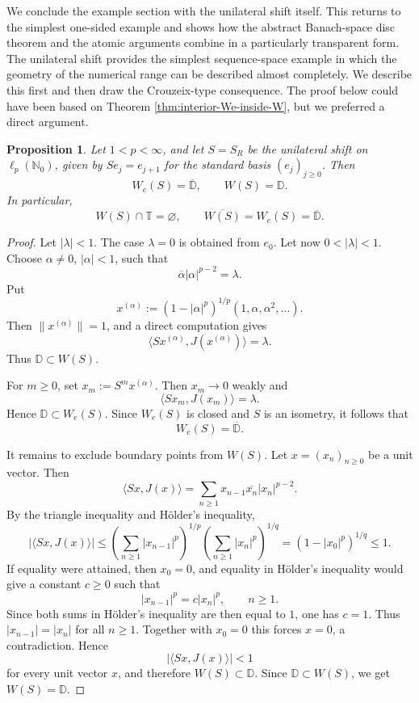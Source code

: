 \documentclass[11pt]{amsart}
\numberwithin{equation}{section}
\newtheorem{proposition}[theorem]{Proposition}
\theoremstyle{definition}
\theoremstyle{remark}
\newcommand{\N}{\mathbb{N}}
\newcommand{\T}{\mathbb{T}}
\newcommand{\D}{\mathbb{D}}
\newcommand{\We}{W_e}
\begin{document}
We conclude the example section with the unilateral shift itself. This returns to the simplest one-sided example and shows how the abstract Banach-space disc theorem and the atomic arguments combine in a particularly transparent form.
The unilateral shift provides the simplest sequence-space example in which the geometry of the numerical range can be described almost completely. We describe this first and then draw the Crouzeix-type consequence.
The proof below could have been based on
Theorem \ref{thm:interior-We-inside-W},
but we preferred a direct argument.
\begin{proposition}\label{cor:shift-disk-lp}
Let \(1<p<\infty\), and let \(S=S_R\) be the unilateral shift on
\(\ell_p(\N_0)\), given by \(Se_j=e_{j+1}\) for the standard basis
\((e_j)_{j\ge0}\). Then
\[
        \We(S)=\overline{\D},\qquad W(S)=\D.
\]
In particular,
\[
        W(S)\cap\T=\varnothing,
        \qquad
        \overline{W(S)}=\We(S)=\overline{\D}.
\]
\end{proposition}
\begin{proof}
Let \(|\lambda|<1\). 
The case \(\lambda=0\) is obtained from \(e_0\). Let now \(0<|\lambda|<1\).
Choose \(\alpha\ne0\), \(|\alpha|<1\), such that
\[
        \overline{\alpha}|\alpha|^{p-2}=\lambda .
\]
Put
\[
        x^{(\alpha)}
        :=
        (1-|\alpha|^p)^{1/p}(1,\alpha,\alpha^2,\ldots).
\]
Then \(\|x^{(\alpha)}\|=1\), and a direct computation gives
\[
        \langle Sx^{(\alpha)},J(x^{(\alpha)})\rangle=\lambda.
\]
Thus \(\mathbb D\subset W(S)\).

For \(m\ge0\), set \(x_m:=S^m x^{(\alpha)}\). Then \(x_m\to0\) weakly and
\[
        \langle Sx_m,J(x_m)\rangle=\lambda.
\]
Hence \(\mathbb D\subset W_e(S)\). Since \(W_e(S)\) is closed and \(S\) is an
isometry, it follows that
\[
        W_e(S)=\overline{\mathbb D}.
\]



It remains to exclude boundary points from \(W(S)\). Let \(x=(x_n)_{n\ge0}\)
be a unit vector. Then
\[
        \langle Sx,J(x)\rangle
        =
        \sum_{n\ge1}x_{n-1}\overline{x_n}|x_n|^{p-2}.
\]
By the triangle inequality and Hölder's inequality,
\[
        |\langle Sx,J(x)\rangle|
        \le
        \left(\sum_{n\ge1}|x_{n-1}|^p\right)^{1/p}
        \left(\sum_{n\ge1}|x_n|^p\right)^{1/q}
        =
        (1-|x_0|^p)^{1/q}
        \le 1.
\]
If equality were attained, then \(x_0=0\), and equality in Hölder's inequality
would give a constant \(c\ge0\) such that
\[
        |x_{n-1}|^p=c|x_n|^p,\qquad n\ge1.
\]
Since both sums in Hölder's inequality are then equal to \(1\), one has
\(c=1\). Thus \(|x_{n-1}|=|x_n|\) for all \(n\ge1\). Together with \(x_0=0\)
this forces \(x=0\), a contradiction. Hence
\[
        |\langle Sx,J(x)\rangle|<1
\]
for every unit vector \(x\), and therefore \(W(S)\subset\mathbb D\). Since
\(\mathbb D\subset W(S)\), we get \(W(S)=\mathbb D\).
\end{proof}
\end{document}
